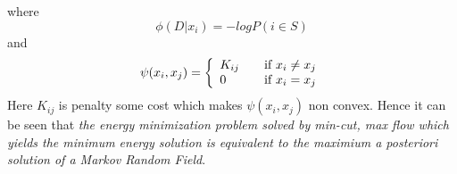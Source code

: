 where 
\[
\phi(D|x_i)  = -logP(i\in S)
\]
 and 
 \[
 \psi(x_i,x_j) = \left\{ 
  \begin{array}{l l}
    K_{ij} & \quad \text{if $x_i \neq x_j$}\\
    0 & \quad \text{if $x_i = x_j$}
  \end{array} \right.
 \]
 Here $K_{ij}$ is penalty some cost which makes $\psi(x_i,x_j)$ non convex.
 Hence it can be seen that {\it the energy minimization problem solved by min-cut, max flow which yields the minimum energy solution is equivalent to the maximium a posteriori solution of a Markov Random Field}.
 
